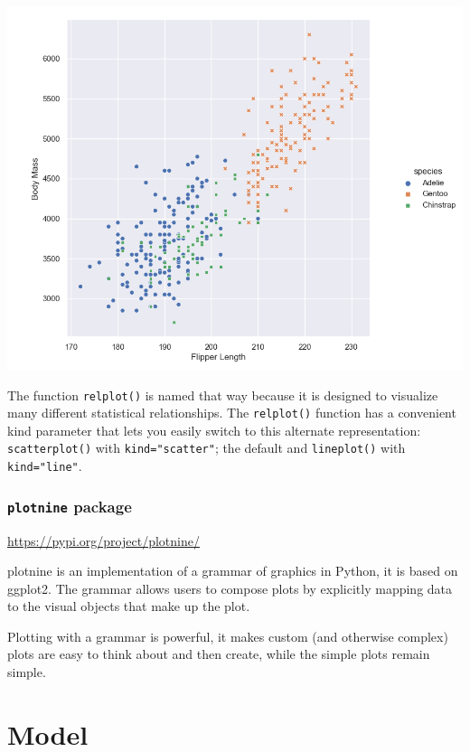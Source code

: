 \documentclass[]{book}
\begin{document}
\begin{center}\includegraphics[width=0.9\linewidth]{fig/Viz_chap/2_seaborn} \end{center}

The function \texttt{relplot()} is named that way because it is designed to visualize many different statistical relationships. The \texttt{relplot()} function has a convenient kind parameter that lets you easily switch to this alternate representation:
\texttt{scatterplot()} with \texttt{kind="scatter"}; the default and \texttt{lineplot()} with \texttt{kind="line"}.

\hypertarget{plotnine-package}{%
\subsection{\texorpdfstring{\texttt{plotnine} package}{plotnine package}}\label{plotnine-package}}

\url{https://pypi.org/project/plotnine/}

plotnine is an implementation of a grammar of graphics in Python, it is based on ggplot2. The grammar allows users to compose plots by explicitly mapping data to the visual objects that make up the plot.

Plotting with a grammar is powerful, it makes custom (and otherwise complex) plots are easy to think about and then create, while the simple plots remain simple.

\hypertarget{model}{%
\chapter{Model}\label{model}}
\end{document}
